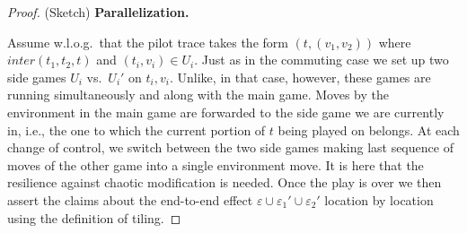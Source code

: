 \documentclass[nocopyrightspace,preprint]{sigplanconf}
\newcommand{\eff}{\varepsilon}
\begin{document}
\begin{proof}
(Sketch) \textbf{Parallelization.} 

Assume w.l.o.g.\ that the pilot trace takes the form $(t,(v_1,v_2))$ where $\textit{inter}(t_1,t_2,t)$ and $(t_i,v_i)\in U_i$. Just as in the commuting case we set up two side games $U_i$ vs.\ $U_i'$ on $t_i,v_i$. Unlike, in that case, however, these games are running simultaneously and along with the main game. Moves by the environment in the main game are forwarded to the side game we are currently in, i.e., the one to which the current portion of $t$ being played on belongs. At each change of control, we switch between the two side games making last sequence of moves of the other game into a single environment move. It is here that the resilience against chaotic modification is needed. Once the play is over we then assert the claims about the end-to-end effect $\eff\cup\eff_1'\cup\eff_2'$ location by location using the definition of tiling. 
\end{proof}
\end{document}
